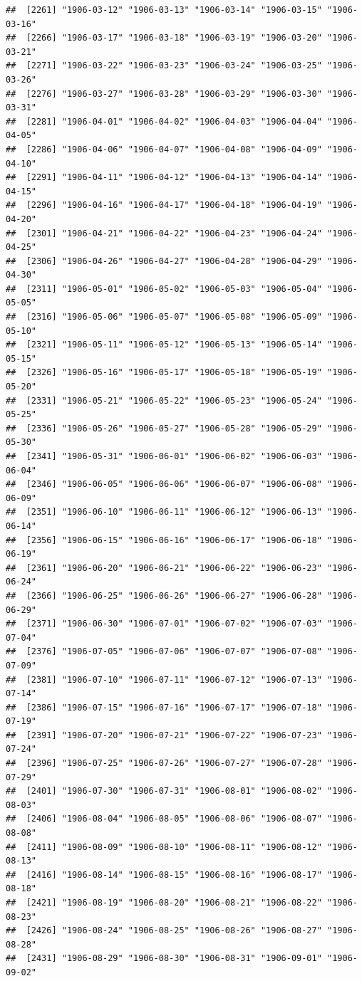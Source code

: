 \documentclass{article}\usepackage[]{graphicx}\usepackage[]{color}
\makeatletter
\newenvironment{kframe}{%
 \def\at@end@of@kframe{}%
 \ifinner\ifhmode%
  \def\at@end@of@kframe{\end{minipage}}%
  \begin{minipage}{\columnwidth}%
 \fi\fi%
 \def\FrameCommand##1{\hskip\@totalleftmargin \hskip-\fboxsep
 \colorbox{shadecolor}{##1}\hskip-\fboxsep
     \hskip-\linewidth \hskip-\@totalleftmargin \hskip\columnwidth}%
 \MakeFramed {\advance\hsize-\width
   \@totalleftmargin\z@ \linewidth\hsize
   \@setminipage}}%
 {\par\unskip\endMakeFramed%
 \at@end@of@kframe}
\newenvironment{knitrout}{}{} %
\makeatother
\begin{document}
\begin{description}
\begin{knitrout}
\begin{kframe}
\begin{verbatim}
##  [2261] "1906-03-12" "1906-03-13" "1906-03-14" "1906-03-15" "1906-03-16"
##  [2266] "1906-03-17" "1906-03-18" "1906-03-19" "1906-03-20" "1906-03-21"
##  [2271] "1906-03-22" "1906-03-23" "1906-03-24" "1906-03-25" "1906-03-26"
##  [2276] "1906-03-27" "1906-03-28" "1906-03-29" "1906-03-30" "1906-03-31"
##  [2281] "1906-04-01" "1906-04-02" "1906-04-03" "1906-04-04" "1906-04-05"
##  [2286] "1906-04-06" "1906-04-07" "1906-04-08" "1906-04-09" "1906-04-10"
##  [2291] "1906-04-11" "1906-04-12" "1906-04-13" "1906-04-14" "1906-04-15"
##  [2296] "1906-04-16" "1906-04-17" "1906-04-18" "1906-04-19" "1906-04-20"
##  [2301] "1906-04-21" "1906-04-22" "1906-04-23" "1906-04-24" "1906-04-25"
##  [2306] "1906-04-26" "1906-04-27" "1906-04-28" "1906-04-29" "1906-04-30"
##  [2311] "1906-05-01" "1906-05-02" "1906-05-03" "1906-05-04" "1906-05-05"
##  [2316] "1906-05-06" "1906-05-07" "1906-05-08" "1906-05-09" "1906-05-10"
##  [2321] "1906-05-11" "1906-05-12" "1906-05-13" "1906-05-14" "1906-05-15"
##  [2326] "1906-05-16" "1906-05-17" "1906-05-18" "1906-05-19" "1906-05-20"
##  [2331] "1906-05-21" "1906-05-22" "1906-05-23" "1906-05-24" "1906-05-25"
##  [2336] "1906-05-26" "1906-05-27" "1906-05-28" "1906-05-29" "1906-05-30"
##  [2341] "1906-05-31" "1906-06-01" "1906-06-02" "1906-06-03" "1906-06-04"
##  [2346] "1906-06-05" "1906-06-06" "1906-06-07" "1906-06-08" "1906-06-09"
##  [2351] "1906-06-10" "1906-06-11" "1906-06-12" "1906-06-13" "1906-06-14"
##  [2356] "1906-06-15" "1906-06-16" "1906-06-17" "1906-06-18" "1906-06-19"
##  [2361] "1906-06-20" "1906-06-21" "1906-06-22" "1906-06-23" "1906-06-24"
##  [2366] "1906-06-25" "1906-06-26" "1906-06-27" "1906-06-28" "1906-06-29"
##  [2371] "1906-06-30" "1906-07-01" "1906-07-02" "1906-07-03" "1906-07-04"
##  [2376] "1906-07-05" "1906-07-06" "1906-07-07" "1906-07-08" "1906-07-09"
##  [2381] "1906-07-10" "1906-07-11" "1906-07-12" "1906-07-13" "1906-07-14"
##  [2386] "1906-07-15" "1906-07-16" "1906-07-17" "1906-07-18" "1906-07-19"
##  [2391] "1906-07-20" "1906-07-21" "1906-07-22" "1906-07-23" "1906-07-24"
##  [2396] "1906-07-25" "1906-07-26" "1906-07-27" "1906-07-28" "1906-07-29"
##  [2401] "1906-07-30" "1906-07-31" "1906-08-01" "1906-08-02" "1906-08-03"
##  [2406] "1906-08-04" "1906-08-05" "1906-08-06" "1906-08-07" "1906-08-08"
##  [2411] "1906-08-09" "1906-08-10" "1906-08-11" "1906-08-12" "1906-08-13"
##  [2416] "1906-08-14" "1906-08-15" "1906-08-16" "1906-08-17" "1906-08-18"
##  [2421] "1906-08-19" "1906-08-20" "1906-08-21" "1906-08-22" "1906-08-23"
##  [2426] "1906-08-24" "1906-08-25" "1906-08-26" "1906-08-27" "1906-08-28"
##  [2431] "1906-08-29" "1906-08-30" "1906-08-31" "1906-09-01" "1906-09-02"

\end{verbatim}
\end{kframe}
\end{knitrout}
\end{description}
\end{document}

